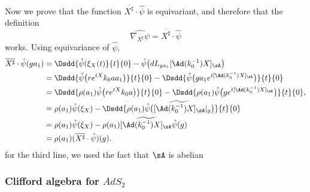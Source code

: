 Now we prove that the function $\overline{ X^{\sharp} }\cdot\hat{\psi}$ is equivariant, and therefore that the definition
\[ 
  \widehat{\nabla_{X^{\sharp}}\psi}=\overline{ X^{\sharp} }\cdot\hat{\psi}
\]
works. Using equivariance of $\hat{\psi}$, 
\begin{equation}
\begin{aligned}
  \overline{ X^{\sharp} }\cdot \hat{\psi}(ga_1)&=\Dsdd{ \hat{\psi}(\xi_X(t) }{t}{0}-\hat{\psi}\big( dL_{ga_1}[\Ad(k_0^{-1})X]_{\sA} \big)\\
        &=\Dsdd{ \hat{\psi}\big( r e^{tX}k_0aa_1 \big) }{t}{0}-\Dsdd{ \hat{\psi}\big( ga_1 e^{t[\Ad(k_0^{-1})X]_{\sA}} \big) }{t}{0}\\
        &=\Dsdd{ \rho(a_1)\hat{\psi}\big( r e^{tX}k_0a \big) }{t}{0}-\Dsdd{ \rho(a_1)\hat{\psi}\big( g e^{t[\Ad(k_0^{-1})X]_{\sA}} \big) }{t}{0},\\
        &=\rho(a_1)\hat{\psi}(\xi_X)-\Dsdd{ \rho(a_1)\hat{\psi}\big( \widetilde{[\Ad(k_0^{-1})X]_{\sA} }|_g \big) }{t}{0}\\
        &=\rho(a_1)\hat{\psi}(\xi_X)-\rho(a_1)\widetilde{ [\Ad(k_0^{-1})X]_{\sA}  }\hat{\psi}(g)\\
        &=\rho(a_1)(\overline{ X^{\sharp} }\cdot\hat{\psi})(g).
\end{aligned}
\end{equation}
for the third line, we used the fact that $\sA$ is abelian
\subsubsection{Clifford algebra for \texorpdfstring{$AdS_2$}{AdS2}}

